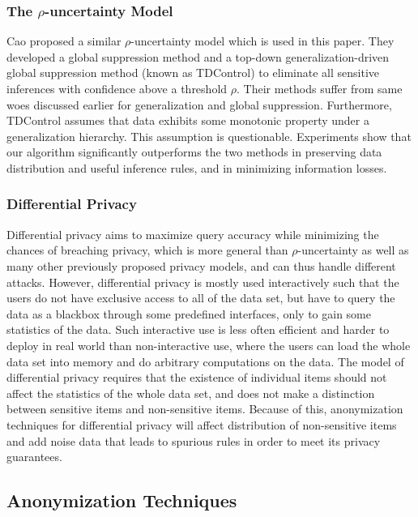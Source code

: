 \subsubsection{The $\rho$-uncertainty Model}

Cao \etal \cite{Cao:2010:rho} proposed a similar $\rho$-uncertainty model
which is used in this paper.
They developed a global suppression method and a top-down
generalization-driven global suppression method (known as TDControl)
to eliminate all sensitive inferences with confidence above
a threshold $\rho$.
Their methods suffer from same woes discussed earlier for generalization and
global suppression.
Furthermore, TDControl 
assumes that data exhibits some monotonic property under a generalization
hierarchy. This assumption is questionable.
Experiments show that our algorithm significantly outperforms the 
two methods in preserving data distribution and useful
inference rules, and in minimizing information losses.

\subsubsection{Differential Privacy}

Differential privacy \cite{Dwork08:diff:survey} aims to maximize query 
accuracy while minimizing the chances of breaching privacy, 
which is more general than $\rho$-uncertainty as well as many other
previously proposed privacy models, and can thus handle different attacks.  
However, differential privacy is mostly used
interactively such that the users do not have exclusive access to
all of the data set, but have to query the data as a blackbox through some
predefined interfaces, only to gain some statistics of the data.  
Such interactive use is less often efficient and harder to
deploy in real world than non-interactive use, 
where the users can load the whole data set into
memory and do arbitrary computations on the data.  
The model of differential privacy requires that the existence of individual items
should not affect the statistics of the whole data set, and does not make a
distinction between sensitive items and non-sensitive items.  Because of this,
anonymization techniques for differential privacy will affect distribution of
non-sensitive items and add noise data that leads to spurious rules
in order to meet its privacy guarantees.

\subsection{Anonymization Techniques}

